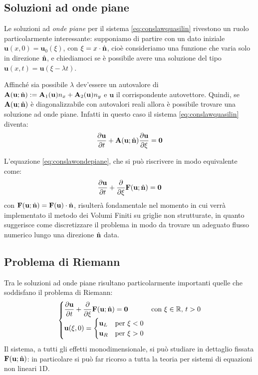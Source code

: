 \subsection{Soluzioni ad onde piane}
Le soluzioni ad \emph{onde piane} per il sistema \eqref{eq:conslawquasilin} rivestono un ruolo particolarmente interessante: supponiamo di partire con un dato iniziale $\mathbf u(x,0) = \mathbf{u}_0 (\xi)$, con $\xi = x \cdot \hat{\mathbf{n}}$, cioè consideriamo una funzione che varia solo in direzione $\hat{\mathbf{n}}$, e chiediamoci se è possibile avere una soluzione del tipo $\mathbf u(x,t) = \mathbf{u}(\xi-\lambda t)$.

Affinché sia possibile $\lambda$ dev'essere un autovalore di $\mathbf{A}(\mathbf{u}; \hat{\mathbf{n}}) := \mathbf{A}_1(\mathbf{u}) n_x + \mathbf{A}_2(\mathbf{u}) n_y$ e $\mathbf{u}$ il corrispondente autovettore. Quindi, se $\mathbf{A}(\mathbf{u}; \hat{\mathbf{n}})$ è diagonalizzabile con autovalori reali allora è possibile trovare una soluzione ad onde piane. Infatti in questo caso il sistema \eqref{eq:conslawquasilin} diventa:
\begin{equation} \label{eq:conslawondepiane}
\dfrac{\partial \mathbf{u}}{\partial t} + \mathbf{A}(\mathbf{u};\hat{\mathbf{n}}) \dfrac{\partial \mathbf u}{\partial \xi} = \mathbf{0}
\end{equation}
 
L'equazione \eqref{eq:conslawondepiane}, che si può riscrivere in modo equivalente come:
\begin{equation*}
\dfrac{\partial \mathbf{u}}{\partial t} + \dfrac{\partial }{\partial \xi} \mathbf{F}(\mathbf{u};\hat{\mathbf{n}}) = \mathbf{0}
\end{equation*}
con $\mathbf{F}(\mathbf{u};\hat{\mathbf{n}}) = \mathbf{F}(\mathbf{u}) \cdot \hat{\mathbf{n}}$, risulterà fondamentale nel momento in cui verrà implementato il metodo dei Volumi Finiti su griglie non strutturate, in quanto suggerisce come discretizzare il problema in modo da trovare un adeguato flusso numerico lungo una direzione $\hat{\mathbf{n}}$ data.
 
\subsection{Problema di Riemann}
Tra le soluzioni ad onde piane risultano particolarmente importanti quelle che soddisfano il problema di Riemann:
\begin{equation} \label{eq:conslawriemann}
\begin{cases}
\dfrac{\partial \mathbf u}{\partial t} + \dfrac{\partial }{\partial \xi}\mathbf{F}(\mathbf u; \hat{\mathbf{n}}) = \mathbf 0 & \text{con $\xi \in \mathbb{R}$, $t > 0$} \\[1.2ex]
\mathbf{u}(\xi,0) = \begin{cases} \mathbf u_L & \text{per $\xi < 0$} \\ \mathbf u_R & \text{per $\xi > 0$} \end{cases}
\end{cases}
\end{equation}
Il sistema, a tutti gli effetti monodimensionale, si può studiare in dettaglio fissata $\mathbf{F}(\mathbf u; \hat{\mathbf{n}})$: in particolare si può far ricorso a tutta la teoria per sistemi di equazioni non lineari 1D.

